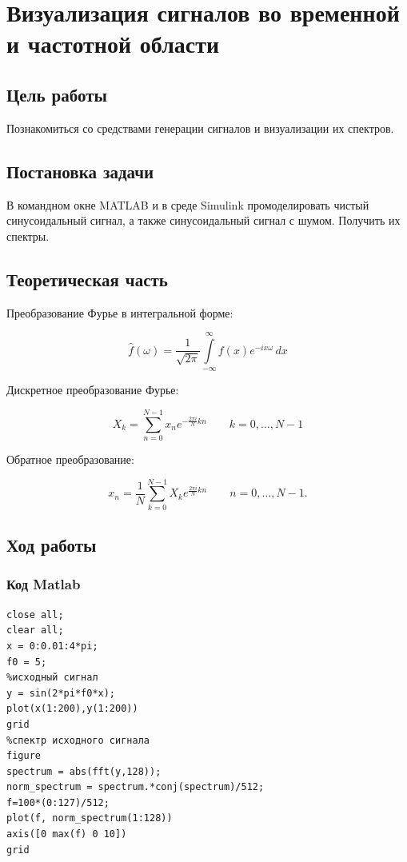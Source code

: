 \chapter{Визуализация сигналов во временной и частотной области}

\section{Цель работы}
Познакомиться со средствами генерации сигналов и визуализации их спектров.

\section{Постановка задачи}
В командном окне MATLAB и в среде Simulink промоделировать чистый синусоидальный сигнал, а также синусоидальный сигнал с шумом. Получить их спектры.

\section{Теоретическая часть}

Преобразование Фурье в интегральной форме:

$$\hat{f}(\omega)=\frac{1}{\sqrt{2\pi}}\int\limits_{-\infty}^{\infty}f(x)e^{-ix\omega}\,dx$$

Дискретное преобразование Фурье:

$$X_k = \sum_{n=0}^{N-1} x_n e^{-\frac{2 \pi i}{N} k n} \qquad k = 0, \dots, N-1$$

Обратное преобразование:

$$x_n = \frac{1}{N} \sum_{k=0}^{N-1} X_k e^{\frac{2\pi i}{N} k n} \quad \quad n = 0,\dots,N-1.$$

\section{Ход работы}

\subsection{Код Matlab}
\begin{lstlisting}
close all;
clear all;
x = 0:0.01:4*pi;
f0 = 5;
%исходный сигнал
y = sin(2*pi*f0*x);
plot(x(1:200),y(1:200))
grid
%спектр исходного сигнала 
figure
spectrum = abs(fft(y,128)); 
norm_spectrum = spectrum.*conj(spectrum)/512;
f=100*(0:127)/512;
plot(f, norm_spectrum(1:128))
axis([0 max(f) 0 10])
grid
\end{lstlisting}

